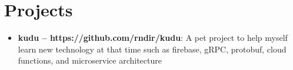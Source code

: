 \documentclass[letterpaper,11pt]{article}
\makeatletter
\newcommand{\resumeItem}[2]{
  \item\small{
    \textbf{#1}{: #2 \vspace{-2pt}}
  }
}
\newcommand{\resumeSubheading}[4]{
  \vspace{-1pt}\item
    \begin{tabular*}{0.97\textwidth}[t]{l@{\extracolsep{\fill}}r}
      \textbf{#1} & #2 \\
      \textit{\small#3} & \textit{\small #4} \\
    \end{tabular*}\vspace{-5pt}
}
\newcommand{\resumeSubItem}[2]{\resumeItem{#1}{#2}\vspace{-4pt}}
\newcommand{\resumeSubHeadingListStart}{\begin{itemize}[leftmargin=*]}
\newcommand{\resumeSubHeadingListEnd}{\end{itemize}}
\makeatother
\begin{document}
\section{Projects}
  \resumeSubHeadingListStart
    \resumeSubItem{kudu -- https://github.com/rndir/kudu}
      {A pet project to help myself learn new technology at that time such as firebase, gRPC, protobuf, cloud functions, and microservice architecture}
  \resumeSubHeadingListEnd
  

\end{document}
